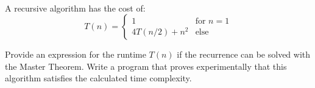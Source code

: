  \\
A recursive algorithm has the cost of: 
\begin{equation}
T(n) = \left\lbrace\begin{array}{ll}
1 & \mbox{for } n=1\\
4T(n/2) + n^2 & \mbox{else}
\end{array}
\right.
\end{equation}

Provide an expression for the runtime  $T(n)$ if the recurrence can be solved 
with the Master Theorem.
Write a program that proves experimentally that this algorithm satisfies the 
calculated time complexity.